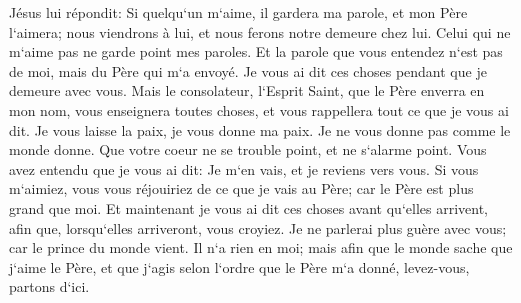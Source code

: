 \verse Jésus lui répondit: Si quelqu`un m`aime, il gardera ma parole, et mon Père l`aimera; nous viendrons à lui, et nous ferons notre demeure chez lui. 
\verse Celui qui ne m`aime pas ne garde point mes paroles. Et la parole que vous entendez n`est pas de moi, mais du Père qui m`a envoyé. 
\verse Je vous ai dit ces choses pendant que je demeure avec vous. 
\verse Mais le consolateur, l`Esprit Saint, que le Père enverra en mon nom, vous enseignera toutes choses, et vous rappellera tout ce que je vous ai dit. 
\verse Je vous laisse la paix, je vous donne ma paix. Je ne vous donne pas comme le monde donne. Que votre coeur ne se trouble point, et ne s`alarme point. 
\verse Vous avez entendu que je vous ai dit: Je m`en vais, et je reviens vers vous. Si vous m`aimiez, vous vous réjouiriez de ce que je vais au Père; car le Père est plus grand que moi. 
\verse Et maintenant je vous ai dit ces choses avant qu`elles arrivent, afin que, lorsqu`elles arriveront, vous croyiez. 
\verse Je ne parlerai plus guère avec vous; car le prince du monde vient. Il n`a rien en moi; 
\verse mais afin que le monde sache que j`aime le Père, et que j`agis selon l`ordre que le Père m`a donné, levez-vous, partons d`ici. 

\chapter{}

